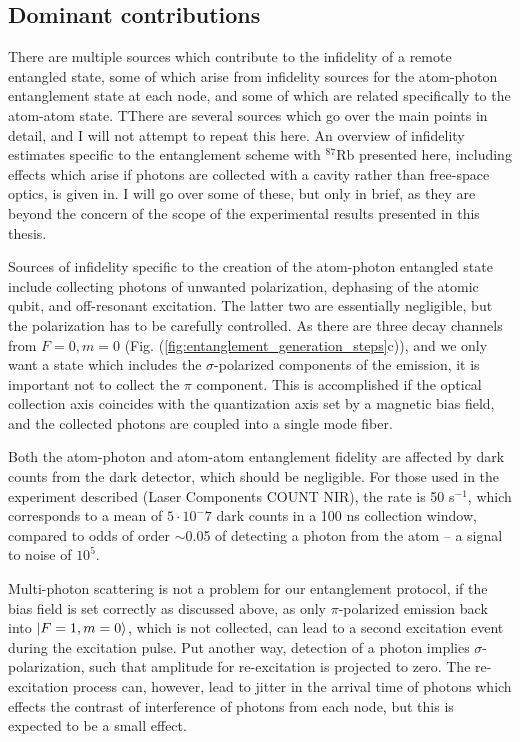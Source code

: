\subsection{Dominant contributions}

There are multiple sources which contribute to the infidelity of a remote entangled state, some of which arise from infidelity sources for the atom-photon entanglement state at each node, and some of which are related specifically to the atom-atom state. TThere are several sources which go over the main points in detail, and I will not attempt to repeat this here. An overview of infidelity estimates specific to the entanglement scheme with $^{87}$Rb presented here, including effects which arise if photons are collected with a cavity rather than free-space optics, is given in\cite{Young2022}. I will go over some of these, but only in brief, as they are beyond the concern of the scope of the experimental results presented in this thesis.

Sources of infidelity specific to the creation of the atom-photon entangled state include collecting photons of unwanted polarization, dephasing of the atomic qubit, and off-resonant excitation. The latter two are essentially negligible, but the polarization has to be carefully controlled. As there are three decay channels from $F=0, m=0$ (Fig. (\ref{fig:entanglement_generation_steps}c)), and we only want a state which includes the $\sigma$-polarized components of the emission, it is important not to collect the $\pi$ component. This is accomplished if the optical collection axis coincides with the quantization axis set by a magnetic bias field, and the collected photons are coupled into a single mode fiber.

Both the atom-photon and atom-atom entanglement fidelity are affected by dark counts from the dark detector, which should be negligible. For those used in the experiment described (Laser Components COUNT NIR), the rate is 50 s$^{-1}$, which corresponds to a mean of $5\cdot 10^-7$ dark counts in a 100 ns collection window, compared to odds of order $\sim$0.05 of detecting a photon from the atom -- a signal to noise of $10^5$.

Multi-photon scattering is not a problem for our entanglement protocol, if the bias field is set correctly as discussed above, as only $\pi$-polarized emission back into $\ket{F=1,m=0}$, which is not collected, can lead to a second excitation event during the excitation pulse. Put another way, detection of a photon implies $\sigma$-polarization, such that amplitude for re-excitation is projected to zero. The re-excitation process can, however, lead to jitter in the arrival time of photons which effects the contrast of interference of photons from each node, but this is expected to be a small effect.

